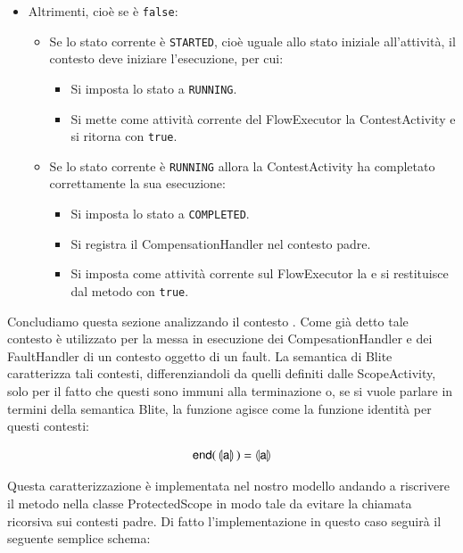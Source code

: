 \begin{itemize}
  \item Altrimenti, cioè se  è \texttt{false}:
  	\begin{itemize}
  		\item Se lo stato corrente \`e \texttt{STARTED}, cioè uguale allo stato
  		iniziale all'attività, il contesto deve iniziare l'esecuzione, per cui:
  			\begin{itemize} 
                \item Si imposta lo stato a \texttt{RUNNING}.
                \item Si mette come attività corrente del FlowExecutor la
                ContestActivity e si ritorna con \texttt{true}.
        	\end{itemize}   
  		\item Se lo stato corrente \`e \texttt{RUNNING} allora la ContestActivity
  		ha completato correttamente la sua esecuzione:
  			\begin{itemize} 
                \item Si imposta lo stato a \texttt{COMPLETED}. 
                \item Si registra il CompensationHandler nel contesto padre.
                \item Si imposta come attività corrente sul FlowExecutor la
                 e si restituisce dal metodo con
                \texttt{true}.
        	\end{itemize}  		 
	\end{itemize}
\end{itemize} 


Concludiamo questa sezione analizzando il contesto . Come
già detto tale contesto è utilizzato per la messa in esecuzione dei
CompesationHandler e dei FaultHandler di un contesto oggetto di un fault.
La semantica di Blite caratterizza tali contesti, differenziandoli da quelli
definiti dalle ScopeActivity, solo per il fatto che questi sono immuni alla
terminazione o, se si vuole parlare in termini della semantica Blite, la
funzione {} agisce come la funzione identità per questi
contesti:

$$
\sf{ end( \, \llparenthesis a \rrparenthesis \, ) = \llparenthesis a
\rrparenthesis }
$$
 
Questa caratterizzazione è implementata nel nostro modello andando a
riscrivere il metodo  nella classe ProtectedScope in
modo tale da evitare la chiamata ricorsiva sui contesti padre. Di fatto
l'implementazione in questo caso seguirà il seguente semplice schema:

